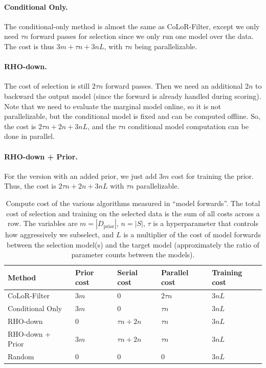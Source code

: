 \documentclass{article}
\newcommand{\Dprior}{D_{\text{prior}}}
\begin{document}
\paragraph{Conditional Only.} The conditional-only method is almost the same as CoLoR-Filter, except we only need $ \tau n$ forward passes for selection since we only run one model over the data. The cost is thus $ 3m + \tau n + 3nL$, with $ \tau n$ being parallelizable.

\paragraph{RHO-down.} The cost of selection is still $ 2 \tau n$ forward passes. Then we need an additional $ 2n$ to backward the output model (since the forward is already handled during scoring). Note that we need to evaluate the marginal model online, so it is not parallelizable, but the conditional model is fixed and can be computed offline. So, the cost is $ 2 \tau n + 2n + 3nL$, and the $ \tau n$ conditional model computation can be done in parallel. 

\paragraph{RHO-down + Prior.} For the version with an added prior, we just add $ 3m$ cost for training the prior. Thus, the cost is $ 2\tau n + 2n + 3nL$ with $ \tau n$ parallelizable.

\begin{table}[t]
    \caption{Compute cost of the various algorithms measured in ``model forwards''. The total cost of selection and training on the selected data is the sum of all costs across a row. The variables are $ m = |\Dprior|$, $ n = |S|$, $ \tau$ is a hyperparameter that controls how aggressively we subselect, and $L $ is a multiplier of the cost of model forwards between the selection model(s) and the target model (approximately the ratio of parameter counts between the models). }
    \label{tab:cost}
    \centering
    \begin{tabular}{lllll}
    \toprule
        Method & Prior cost & Serial cost & Parallel cost & Training cost\\
        \midrule
        CoLoR-Filter &  $ 3m $ & $0$ & $2 \tau n$ & $3n L$ \\[3pt]
        Conditional Only & $ 3m $ & $ 0 $ & $\tau n$& $3n L$\\[3pt]
        RHO-down & 0 & $ \tau n + 2 n $ & $\tau n$& $3n L$\\[3pt]
        RHO-down + Prior & $ 3m $ &  $\tau n + 2n$ & $\tau n$& $3n L$\\[3pt]
        Random & 0 &  0 & 0 & $3n L$\\
    \bottomrule
    \end{tabular}
\end{table}
\end{document}
